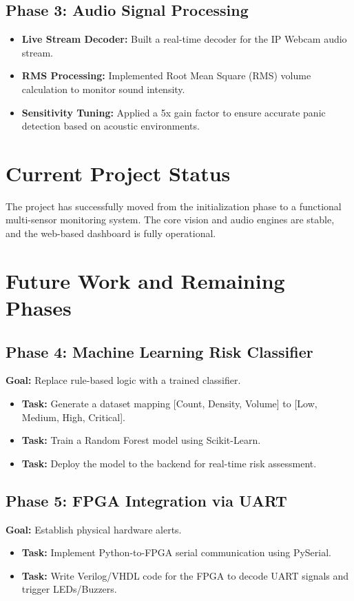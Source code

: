 \documentclass[12pt,a4paper]{article}
\begin{document}
\subsection{Phase 3: Audio Signal Processing}
\begin{itemize}
    \item \textbf{Live Stream Decoder:} Built a real-time decoder for the IP Webcam audio stream.
    \item \textbf{RMS Processing:} Implemented Root Mean Square (RMS) volume calculation to monitor sound intensity.
    \item \textbf{Sensitivity Tuning:} Applied a 5x gain factor to ensure accurate panic detection based on acoustic environments.
\end{itemize}

\section{Current Project Status}
The project has successfully moved from the initialization phase to a functional multi-sensor monitoring system. The core vision and audio engines are stable, and the web-based dashboard is fully operational.

\section{Future Work and Remaining Phases}

\subsection{Phase 4: Machine Learning Risk Classifier}
\textbf{Goal:} Replace rule-based logic with a trained classifier.
\begin{itemize}
    \item \textbf{Task:} Generate a dataset mapping [Count, Density, Volume] to [Low, Medium, High, Critical].
    \item \textbf{Task:} Train a Random Forest model using Scikit-Learn.
    \item \textbf{Task:} Deploy the model to the backend for real-time risk assessment.
\end{itemize}

\subsection{Phase 5: FPGA Integration via UART}
\textbf{Goal:} Establish physical hardware alerts.
\begin{itemize}
    \item \textbf{Task:} Implement Python-to-FPGA serial communication using PySerial.
    \item \textbf{Task:} Write Verilog/VHDL code for the FPGA to decode UART signals and trigger LEDs/Buzzers.
\end{itemize}
\end{document}
